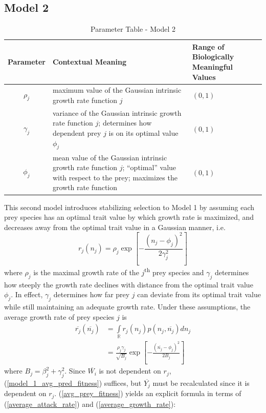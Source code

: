 \documentclass{amsart}
\theoremstyle{definition}
\theoremstyle{remark}
\numberwithin{equation}{section}
\begin{document}
\subsection{Model 2}
\begin{table}
	\label{parameter_table_model_2}
	\caption{Parameter Table - Model 2}
    \begin{tabular}{||c|L{7cm}|L{2.5cm}||}\hline\hline
    {\bf Parameter} & {\bf Contextual Meaning} & {\bf Range of Biologically Meaningful Values} \\\hline\hline
    $\rho_j$ & maximum value of the Gaussian intrinsic growth rate function $j$ & $(0, 1)$ \\\hline
    $\gamma_j$ & variance of the Gaussian intrinsic growth rate function $j$; determines how dependent prey $j$ is on its optimal value $\phi_j$ & $(0, 1)$ \\\hline
    $\phi_j$ & mean value of the Gaussian intrinsic growth rate function $j$; ``optimal'' value with respect to the prey; maximizes the growth rate function & $(0, 1)$ \\\hline\hline
    \end{tabular}
\end{table}
This second model introduces stabilizing selection to Model 1 by assuming each prey species has an optimal trait value by which growth rate is maximized, and decreases away from the optimal trait value in a Gaussian manner, i.e.
\begin{equation}
	\label{growth_rate}
	r_j(n_j) = \rho_j\exp{\left[-\frac{(n_j - \phi_j)^2}{2\gamma_j^2}\right]}
\end{equation}
where $\rho_j$ is the maximal growth rate of the $j$\textsuperscript{th} prey species and $\gamma_j$ determines how steeply the growth rate declines with distance from the optimal trait value $\phi_j$.  In effect, $\gamma_j$ determines how far prey $j$ can deviate from its optimal trait value while still maintaining an adequate growth rate.  Under these assumptions, the average growth rate of prey species $j$ is
\begin{equation}
	\label{average_growth_rate}
	\begin{aligned}
		\overline{r_j}(\overline{n_j}) &= \int\limits_{\mathbb{R}}^{}r_j(n_j)p(n_j, \overline{n_j})dn_j \\
		&= \frac{\rho_j\gamma_j}{\sqrt{B_j}}\exp\left[-\frac{(\overline{n_j} - \phi_j)^2}{2B_j}\right]
	\end{aligned}
\end{equation}
where $B_j = \beta_j^2 + \gamma_j^2$.  Since $\overline{W_i}$ is not dependent on $r_j$, (\ref{model_1_avg_pred_fitness}) suffices, but $\overline{Y_j}$ must be recalculated since it is dependent on $r_j$.  (\ref{avg_prey_fitness}) yields an explicit formula in terms of (\ref{average_attack_rate}) and (\ref{average_growth_rate}):
\end{document}
